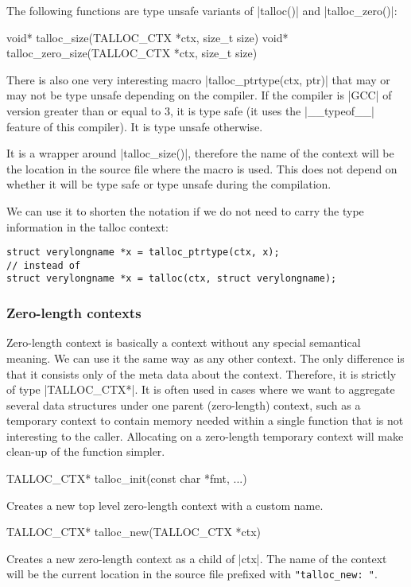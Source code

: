 The following functions are type unsafe variants of |talloc()| and
|talloc_zero()|:

\begin{funcproto}
void* talloc_size(TALLOC_CTX *ctx, size_t size)
void* talloc_zero_size(TALLOC_CTX *ctx, size_t size)
\end{funcproto}
\funclistend
There is also one very interesting macro |talloc_ptrtype(ctx, ptr)| that may or
may not be type unsafe depending on the compiler. If the compiler is |GCC| of
version greater than or equal to 3, it is type safe (it uses the |__typeof__|
feature of this compiler). It is type unsafe otherwise.

It is a wrapper around |talloc_size()|, therefore the name of the context will
be the location in the source file where the macro is used. This does not depend
on whether it will be type safe or type unsafe during the compilation.

We can use it to shorten the notation if we do not need to carry the type
information in the talloc context:

\begin{lstlisting}[caption={talloc_ptrtype(ctx, ptr)},label=lst:talloc_ptrtype]
struct verylongname *x = talloc_ptrtype(ctx, x);
// instead of
struct verylongname *x = talloc(ctx, struct verylongname);
\end{lstlisting}

\subsubsection{Zero-length contexts}

Zero-length context is basically a context without any special semantical
meaning. We can use it the same way as any other context. The only difference
is that it consists only of the meta data about the context. Therefore, it is
strictly of type |TALLOC_CTX*|. It is often used in cases where we want to
aggregate several data structures under one parent (zero-length) context, such
as a temporary context to contain memory needed within a single function that
is not interesting to the caller. Allocating on a zero-length temporary context
will make clean-up of the function simpler.

\begin{funcproto}
TALLOC_CTX* talloc_init(const char *fmt, ...)
\end{funcproto}
\begin{funcdesc}
Creates a new top level zero-length context with a custom name.
\end{funcdesc}
\begin{funcproto}
TALLOC_CTX* talloc_new(TALLOC_CTX *ctx)
\end{funcproto}
\begin{funcdesc}
Creates a new zero-length context as a child of |ctx|. The name of the context
will be the current location in the source file prefixed with
\lstinline[showspaces=true]{"talloc_new: "}.
\end{funcdesc}

